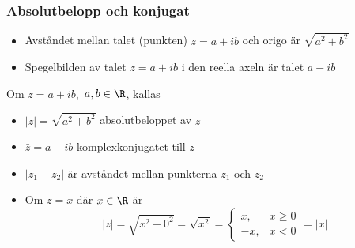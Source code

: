 \documentclass[slidestop,blue,handout,9pt]{beamer}
\begin{document}
\begin{frame}
\frametitle{Absolutbelopp och konjugat}
\begin{itemize}
\item Avståndet mellan talet (punkten) $z=a+ib$ och origo är 
$\sqrt{a^2 + b^2}$
\item Spegelbilden av talet $z=a+ib$ i den reella axeln är talet $a - ib$ 
\end{itemize}
\hspace{0.1cm}
\hspace{0.1cm}
\begin{definition}
\label{abs}
Om $z = a + ib$, $\,a,b\in \R$, kallas

\begin{itemize}
\item  $|z| = \sqrt{a^2 + b^2}$ \alert{absolutbeloppet} av $z$

\item  $\bar{z} = a - ib$ \alert{komplexkonjugatet} till $z$
\end{itemize}
\end{definition}

\begin{itemize}
\item<6->$|z_1 - z_2|$ är avståndet mellan punkterna $z_1$ och $z_2$
\item<7-> Om $z = x$ där $x\in\R$ är
\[
|z| = \sqrt{x^2+0^2} = \sqrt{x^2} = 
\begin{cases}
x,& x\geq 0\\
-x,& x<0  
\end{cases}
= |x|
\]


\end{itemize}


\end{frame}
\end{document}
